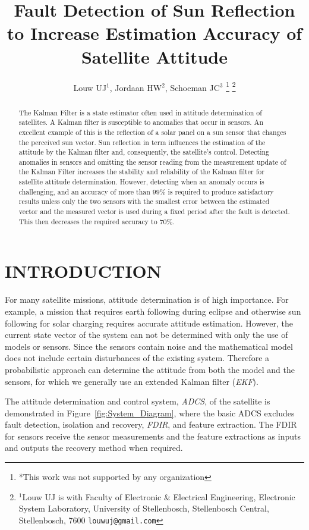 \documentclass[letterpaper, 10 pt, conference]{ieeeconf}  %
\title{\LARGE \bf
Fault Detection of Sun Reflection to Increase Estimation Accuracy of Satellite Attitude
}
\author{Louw UJ$^{1}$, Jordaan HW$^{2}$, Schoeman JC$^{3}$%
\thanks{*This work was not supported by any organization}%
\thanks{$^{1}$Louw UJ is with Faculty of Electronic \& Electrical Engineering, Electronic System            Laboratory, University of Stellenbosch, Stellenbosch Central, Stellenbosch, 7600
        {\tt\small louwuj@gmail.com}}%
}
\begin{document}
\maketitle
\thispagestyle{empty}
\pagestyle{empty}


\begin{abstract}

The Kalman Filter is a state estimator often used in attitude determination of satellites. A Kalman filter is susceptible to anomalies that occur in sensors. An excellent example of this is the reflection of a solar panel on a sun sensor that changes the perceived sun vector. Sun reflection in term influences the estimation of the attitude by the Kalman filter and, consequently, the satellite's control. Detecting anomalies in sensors and omitting the sensor reading from the measurement update of the Kalman Filter increases the stability and reliability of the Kalman filter for satellite attitude determination. However, detecting when an anomaly occurs is challenging, and an accuracy of more than $99\%$ is required to produce satisfactory results unless only the two sensors with the smallest error between the estimated vector and the measured vector is used during a fixed period after the fault is detected. This then decreases the required accuracy to $70\%$.

\end{abstract}

\section{INTRODUCTION}
For many satellite missions, attitude determination is of high importance. For example, a mission that requires earth following during eclipse and otherwise sun following for solar charging requires accurate attitude estimation. However, the current state vector of the system can not be determined with only the use of models or sensors. Since the sensors contain noise and the mathematical model does not include certain disturbances of the existing system. Therefore a probabilistic approach can determine the attitude from both the model and the sensors, for which we generally use an extended Kalman filter (\emph{EKF}).

The attitude determination and control system, \emph{ADCS}, of the satellite is demonstrated in Figure~\ref{fig:System_Diagram}, where the basic ADCS excludes fault detection, isolation and recovery, \emph{FDIR}, and feature extraction. The FDIR for sensors receive the sensor measurements and the feature extractions as inputs and outputs the recovery method when required. 
\end{document}
